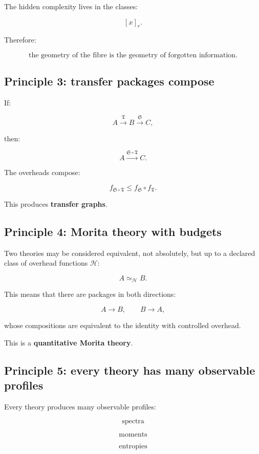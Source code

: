 \documentclass[11pt]{article}
\begin{document}
The hidden complexity lives in the classes:

\[
[x]_r.
\]

Therefore:

\[
\boxed{
\text{the geometry of the fibre is the geometry of forgotten information.}
}
\]



\subsection*{Principle 3: transfer packages compose}

If:

\[
A\xrightarrow{\mathfrak T}B\xrightarrow{\mathfrak S}C,
\]

then:

\[
A\xrightarrow{\mathfrak S\circ\mathfrak T}C.
\]

The overheads compose:

\[
f_{\mathfrak S\circ\mathfrak T}
\le
f_{\mathfrak S}\circ f_{\mathfrak T}.
\]

This produces \textbf{transfer graphs}.



\subsection*{Principle 4: Morita theory with budgets}

Two theories may be considered equivalent, not absolutely, but up to a declared class of overhead functions \(\mathcal H\):

\[
A\simeq_{\mathcal H}B.
\]

This means that there are packages in both directions:

\[
A\to B,
\qquad
B\to A,
\]

whose compositions are equivalent to the identity with controlled overhead.

This is a \textbf{quantitative Morita theory}.



\subsection*{Principle 5: every theory has many observable profiles}

Every theory produces many observable profiles:

\[
\text{spectra}
\]

\[
\text{moments}
\]

\[
\text{entropies}
\]
\end{document}
